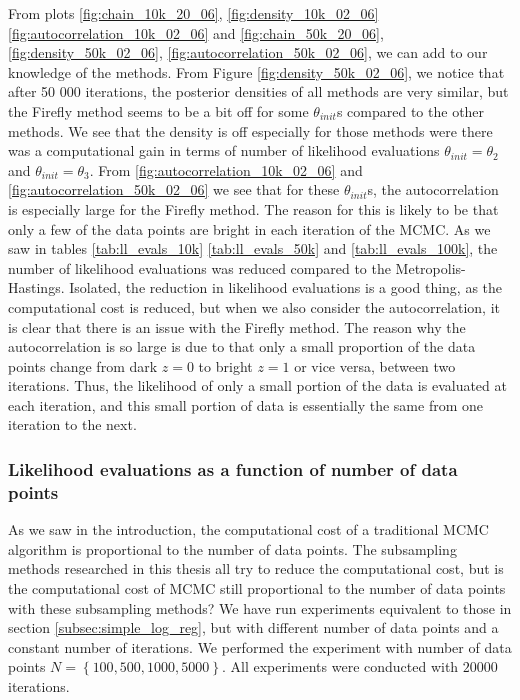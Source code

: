 From plots \ref{fig:chain_10k_20_06}, \ref{fig:density_10k_02_06} \ref{fig:autocorrelation_10k_02_06} and \ref{fig:chain_50k_20_06}, \ref{fig:density_50k_02_06}, \ref{fig:autocorrelation_50k_02_06}, we can add to our knowledge of the methods. 
From Figure \ref{fig:density_50k_02_06},  we  notice that after 50 000 iterations, the posterior densities of all methods are very similar, but the Firefly method seems to be a bit off for some $\theta_{init}$s compared to the other methods. We see that the density is off especially for those methods were there was a computational gain in terms of number of likelihood evaluations $\theta_{init} = \theta_2$ and $\theta_{init} = \theta_3$. From  \ref{fig:autocorrelation_10k_02_06} and \ref{fig:autocorrelation_50k_02_06} we see that for these $\theta_{init}$s, the autocorrelation is especially large for the Firefly method. 
The reason for this is likely to be that only a few of the data points are bright in each iteration of the MCMC. As we saw in tables \ref{tab:ll_evals_10k} \ref{tab:ll_evals_50k} and \ref{tab:ll_evals_100k}, the number of likelihood evaluations was reduced compared to the Metropolis-Hastings.
Isolated, the reduction in likelihood evaluations is a good thing, as the computational cost is reduced, but when we also consider the autocorrelation, it is clear that there is an issue with the Firefly method. 
The reason why the autocorrelation is so large is due to that only a small proportion of the data points change from dark $z = 0$ to bright $z = 1$ or vice versa, between two iterations. 
Thus, the likelihood of only a small portion of the data is evaluated at each iteration, and this small portion of data is essentially the same from one iteration to the next. 

\subsubsection{Likelihood evaluations as a function of number of data points}As we saw in the introduction, the computational cost of a traditional MCMC algorithm is proportional to the number of data points. 
The subsampling methods researched in this thesis all try to reduce the computational cost, but is the computational cost of MCMC still proportional to the number of data points with these subsampling methods? 
We have run experiments equivalent to those in section \ref{subsec:simple_log_reg}, but with different number of data points and a constant number of iterations. We performed the experiment with number of data points $N = \left\{100, 500, 1000, 5000\right\}$. All experiments were conducted with $20000$ iterations. 


